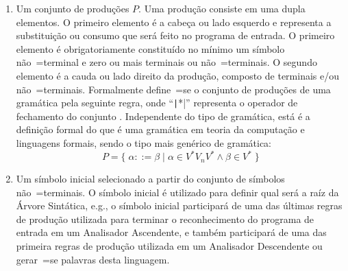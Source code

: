 \begin{enumerate}
    \item \label{item:definicaoDeGramatica}Um conjunto de produções $P$.
    Uma produção consiste em uma dupla elementos.
    O primeiro elemento é a cabeça ou
    lado esquerdo e
    representa a substituição ou
    consumo que será feito no programa de entrada.
    O primeiro elemento é obrigatoriamente constituído no mínimo um símbolo não~=terminal e
    zero ou mais terminais ou
    não~=terminais.
    O segundo elemento é a cauda ou
    lado direito da produção,
    composto de terminais e\slash{}ou não~=terminais.
    Formalmente define~=se o conjunto de produções de uma gramática pela seguinte regra,
    onde ``\texttt|*|'' representa o operador de fechamento do conjunto \cite{hopcroftBook}.
    Independente do tipo de gramática,
    está é a definição formal do que é uma gramática em teoria da computação e
    linguagens formais,
    sendo o tipo mais genérico de gramática:
    $$P = \{\; \alpha ::= \beta \;|\; \alpha \in V^* V_n V^* \land \beta \in V^* \;\}$$

    \item Um símbolo inicial selecionado a partir do conjunto de símbolos não~=terminais.
    O símbolo inicial é utilizado para definir qual será a raíz da Árvore Sintática,
    e.g.,
    o símbolo inicial participará de uma das últimas regras de produção utilizada para terminar o reconhecimento do programa de entrada em um Analisador Ascendente,
    e também participará de uma das primeira regras de produção utilizada em um Analisador Descendente ou
    gerar~=se palavras desta linguagem.
\end{enumerate}

